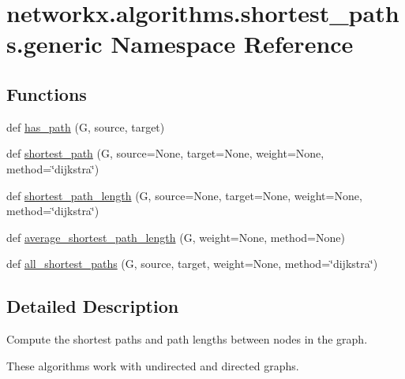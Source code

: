 \hypertarget{namespacenetworkx_1_1algorithms_1_1shortest__paths_1_1generic}{}\section{networkx.\+algorithms.\+shortest\+\_\+paths.\+generic Namespace Reference}
\label{namespacenetworkx_1_1algorithms_1_1shortest__paths_1_1generic}
\subsection*{Functions}
\begin{DoxyCompactItemize}
\item 
def \hyperlink{namespacenetworkx_1_1algorithms_1_1shortest__paths_1_1generic_aa9004ba323dd9fd872d3e97769f28e1d}{has\+\_\+path} (G, source, target)
\item 
def \hyperlink{namespacenetworkx_1_1algorithms_1_1shortest__paths_1_1generic_ac7e350c9388364d06e2a82553130da2b}{shortest\+\_\+path} (G, source=None, target=None, weight=None, method=\char`\"{}dijkstra\char`\"{})
\item 
def \hyperlink{namespacenetworkx_1_1algorithms_1_1shortest__paths_1_1generic_a1497db0f134f911fea5d66ce6adda7de}{shortest\+\_\+path\+\_\+length} (G, source=None, target=None, weight=None, method=\char`\"{}dijkstra\char`\"{})
\item 
def \hyperlink{namespacenetworkx_1_1algorithms_1_1shortest__paths_1_1generic_a9fd450807fac1acf3a78c14109ea672a}{average\+\_\+shortest\+\_\+path\+\_\+length} (G, weight=None, method=None)
\item 
def \hyperlink{namespacenetworkx_1_1algorithms_1_1shortest__paths_1_1generic_aacdabc1eb6e505b924c4de9f23a71718}{all\+\_\+shortest\+\_\+paths} (G, source, target, weight=None, method=\char`\"{}dijkstra\char`\"{})
\end{DoxyCompactItemize}


\subsection{Detailed Description}
\begin{DoxyVerb}Compute the shortest paths and path lengths between nodes in the graph.

These algorithms work with undirected and directed graphs.\end{DoxyVerb}
 

